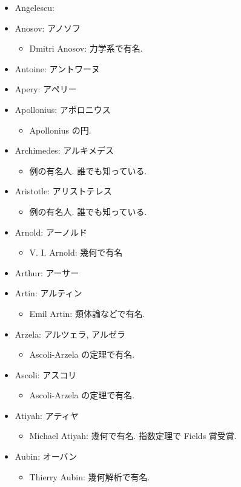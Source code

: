 \documentclass[openany, a4paper, oneside]{jsbook}
\begin{document}
\begin{itemize}
\item Angelescu:
\item Anosov: アノソフ
\begin{itemize}
\item Dmitri Anosov: 力学系で有名.
\end{itemize}
\item Antoine: アントワーヌ
\item Apery: アペリー
\item Apollonius: アポロニウス
\begin{itemize}
\item Apollonius の円.
\end{itemize}
\item Archimedes: アルキメデス
\begin{itemize}
\item 例の有名人. 誰でも知っている.
\end{itemize}
\item Aristotle: アリストテレス
\begin{itemize}
\item 例の有名人. 誰でも知っている.
\end{itemize}
\item Arnold: アーノルド
\begin{itemize}
\item V. I. Arnold: 幾何で有名
\end{itemize}
\item Arthur: アーサー
\item Artin: アルティン
\begin{itemize}
\item Emil Artin: 類体論などで有名.
\end{itemize}
\item Arzela: アルツェラ, アルゼラ
\begin{itemize}
\item Ascoli-Arzela の定理で有名.
\end{itemize}
\item Ascoli: アスコリ
\begin{itemize}
\item Ascoli-Arzela の定理で有名.
\end{itemize}
\item Atiyah: アティヤ
\begin{itemize}
\item Michael Atiyah: 幾何で有名. 指数定理で Fields 賞受賞.
\end{itemize}
\item Aubin: オーバン
\begin{itemize}
\item Thierry Aubin: 幾何解析で有名.
\end{itemize}
\end{itemize}
\end{document}
